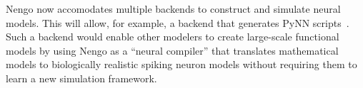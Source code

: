 \documentclass[12pt]{article}
\begin{document}
  Nengo now accomodates multiple backends 
  to construct and simulate neural models.
  This will allow, for example,
  a backend that generates PyNN scripts~\cite{pynn}.
  Such a backend would enable other modelers to create
  large-scale functional models by using Nengo
  as a ``neural compiler'' that translates mathematical
  models to biologically realistic spiking neuron models
  without requiring them to learn a new simulation framework.

\begingroup
\renewcommand{\section}[2]{}%
{\scriptsize
\begin{multicols}{2}


\end{multicols}}
\endgroup
\end{document}
